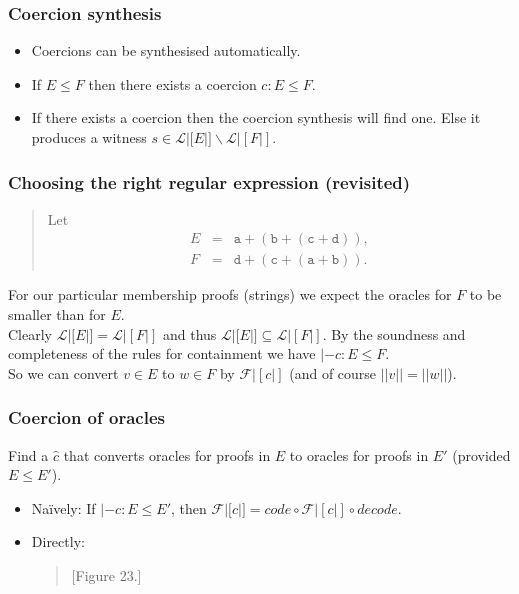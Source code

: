 \documentclass[slidestop,compress,mathserif, xcolor=table]{beamer}
\begin{document}
\begin{frame}[c]
  \frametitle{Coercion synthesis}

  
  \begin{itemize}
  \item Coercions can be synthesised automatically.

  \item If $E \leq F$ then there exists a coercion $c : E \leq F$.

  \item If there exists a coercion then the coercion synthesis will find
    one. Else it produces a witness $s \in \mathcal{L}|[E|] \backslash
    \mathcal{L}|[F|]$.
  \end{itemize}


\end{frame}

\begin{frame}
  \frametitle{Choosing the right regular expression (revisited)}

  \begin{quote}
    Let
    \begin{eqnarray*}
      E &=& \mathtt{a} + (\mathtt{b} + (\mathtt{c} + \mathtt{d})),\\
      F &=& \mathtt{d} + (\mathtt{c} + (\mathtt{a} + \mathtt{b})).
    \end{eqnarray*}
  \end{quote}
  For our particular membership proofs (strings) we expect the oracles for $F$
  to be smaller than for $E$.\\[1em]

  Clearly $\mathcal{L}|[E|] = \mathcal{L}|[F|]$ and thus $\mathcal{L}|[E|]
  \subseteq \mathcal{L}|[F|]$. By the soundness and completeness of the rules
  for containment we have $|- c : E \leq F$.\\[1em]

  So we can convert $v \in E$ to $w \in F$ by $\mathcal{F}|[c|]$ (and of course
  $||v|| = ||w||$).
\end{frame}

\begin{frame}
  \frametitle{Coercion of oracles}

  Find a $\hat{c}$ that converts oracles for proofs in $E$ to oracles for proofs
  in $E'$ (provided $E \leq E'$).

    \begin{itemize}
    \item Naïvely: If $|- c : E \leq E'$, then $\mathcal{F}|[\hat{c}|] =
      code \circ \mathcal{F}|[c|] \circ decode$.
    \item Directly:
      \begin{quote}
        [Figure 23.]
      \end{quote}
    \end{itemize}
\end{frame}
\end{document}

